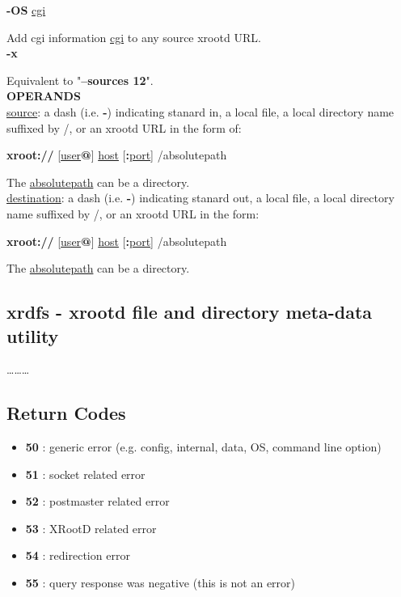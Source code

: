 \documentclass{article}
\begin{document}
		\noindent \textbf{-OS} \underline{cgi}

		\noindent Add cgi information \underline{cgi} to any source xrootd URL. \\
		
		\noindent \textbf{-x}

		\noindent Equivalent to "\textbf{--sources 12}". \\
		
		\pagebreak
		\noindent \textbf{OPERANDS} \\
		
		\noindent \underline{source}: a dash (i.e. \textbf{-}) indicating stanard in, a local file, a local directory 
		name suffixed by /, or an xrootd URL in the form of:
		
		\textbf{xroot://} [\underline{user}\textbf{@}] \underline{host} [\textbf{:}\underline{port}] /absolutepath
		
		\noindent The \underline{absolutepath} can be a directory. \\
		
		\noindent \underline{destination}: a dash (i.e. \textbf{-}) indicating stanard out, a local file, a local directory
		name suffixed by /, or an xrootd URL in the form:

		\textbf{xroot://} [\underline{user}\textbf{@}] \underline{host} [\textbf{:}\underline{port}] /absolutepath

		\noindent The \underline{absolutepath} can be a directory. \\
		
    \subsection{xrdfs - xrootd file and directory meta-data utility}
    	\ldots\ldots\ldots

	\subsection{Return Codes}
		\begin{itemize}
  			\item \textbf{50} : generic error (e.g. config, internal, data, OS, command line option)
  			\item \textbf{51} : socket related error
			\item \textbf{52} : postmaster related error
			\item \textbf{53} : XRootD related error
			\item \textbf{54} : redirection error
			\item \textbf{55} : query response was negative (this is not an error)
		\end{itemize}
\end{document}

